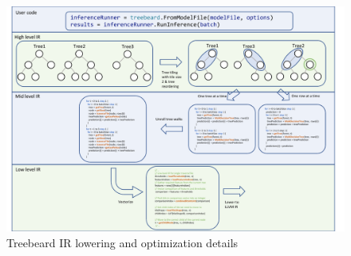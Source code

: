 \begin{figure}
  \centering
  \includegraphics[width=\textwidth]{figures/OverviewExample.pdf}
  \caption{Treebeard IR lowering and optimization details}
  \label{Fig:Overview}
\end{figure}




